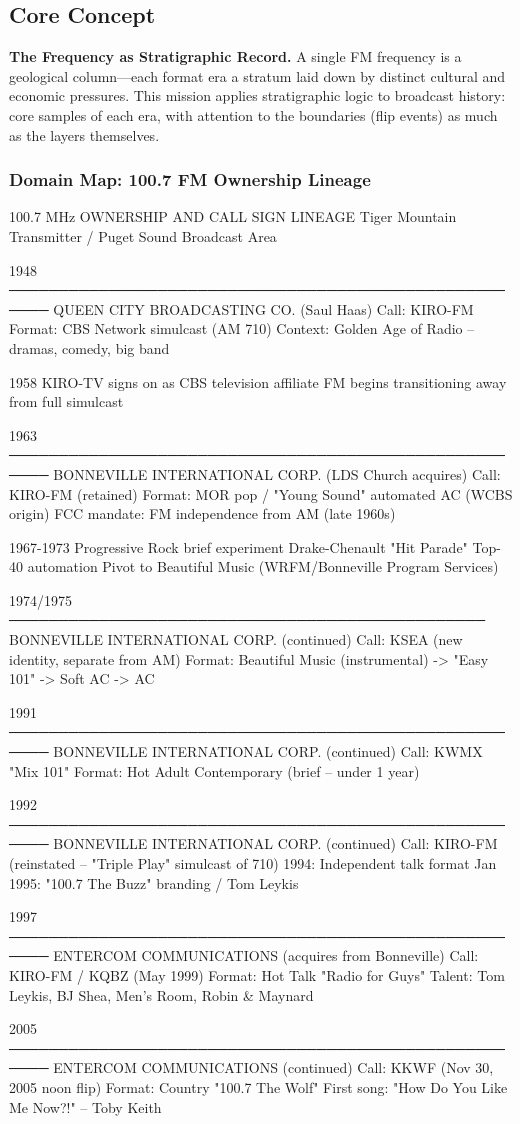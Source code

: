 \documentclass[11pt,letterpaper]{article}
\begin{document}
\subsection{Core Concept}

\textbf{The Frequency as Stratigraphic Record.} A single FM frequency is a geological column---each format era a stratum laid down by distinct cultural and economic pressures. This mission applies stratigraphic logic to broadcast history: core samples of each era, with attention to the boundaries (flip events) as much as the layers themselves.

\subsubsection{Domain Map: 100.7 FM Ownership Lineage}

\begin{asciibox}
100.7 MHz OWNERSHIP AND CALL SIGN LINEAGE
Tiger Mountain Transmitter / Puget Sound Broadcast Area

1948 ──────────────────────────────────────────────────────
  QUEEN CITY BROADCASTING CO. (Saul Haas)
  Call: KIRO-FM
  Format: CBS Network simulcast (AM 710)
  Context: Golden Age of Radio -- dramas, comedy, big band

1958  KIRO-TV signs on as CBS television affiliate
      FM begins transitioning away from full simulcast

1963 ──────────────────────────────────────────────────────
  BONNEVILLE INTERNATIONAL CORP. (LDS Church acquires)
  Call: KIRO-FM (retained)
  Format: MOR pop / "Young Sound" automated AC (WCBS origin)
  FCC mandate: FM independence from AM (late 1960s)

1967-1973  Progressive Rock brief experiment
           Drake-Chenault "Hit Parade" Top-40 automation
           Pivot to Beautiful Music (WRFM/Bonneville Program Services)

1974/1975 ────────────────────────────────────────────────
  BONNEVILLE INTERNATIONAL CORP. (continued)
  Call: KSEA (new identity, separate from AM)
  Format: Beautiful Music (instrumental) -> "Easy 101" -> Soft AC -> AC

1991 ──────────────────────────────────────────────────────
  BONNEVILLE INTERNATIONAL CORP. (continued)
  Call: KWMX "Mix 101"
  Format: Hot Adult Contemporary (brief -- under 1 year)

1992 ──────────────────────────────────────────────────────
  BONNEVILLE INTERNATIONAL CORP. (continued)
  Call: KIRO-FM (reinstated -- "Triple Play" simulcast of 710)
  1994: Independent talk format
  Jan 1995: "100.7 The Buzz" branding / Tom Leykis

1997 ──────────────────────────────────────────────────────
  ENTERCOM COMMUNICATIONS (acquires from Bonneville)
  Call: KIRO-FM / KQBZ (May 1999)
  Format: Hot Talk "Radio for Guys"
  Talent: Tom Leykis, BJ Shea, Men's Room, Robin & Maynard

2005 ──────────────────────────────────────────────────────
  ENTERCOM COMMUNICATIONS (continued)
  Call: KKWF (Nov 30, 2005 noon flip)
  Format: Country "100.7 The Wolf"
  First song: "How Do You Like Me Now?!" -- Toby Keith
\end{asciibox}
\end{document}
